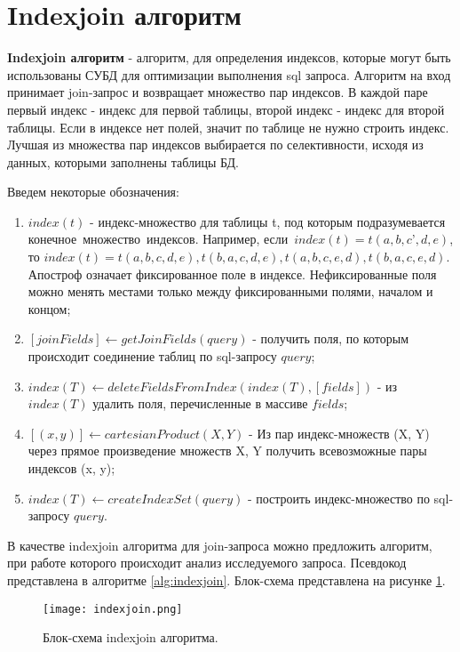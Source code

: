 \section{Indexjoin алгоритм}

\textbf{Indexjoin алгоритм} - алгоритм, для определения индексов, которые могут быть использованы СУБД для оптимизации выполнения sql запроса. Алгоритм на вход принимает join-запрос и возвращает множество пар индексов. В каждой паре первый индекс - индекс для первой таблицы, второй индекс - индекс для второй таблицы. Если в индексе нет полей, значит по таблице не нужно строить индекс. Лучшая из множества пар индексов выбирается по селективности, исходя из данных, которыми заполнены таблицы БД.

Введем некоторые обозначения:
\begin{enumerate}
\item $index(t)$ - индекс-множество для таблицы t, под которым подразумевается конечное множество индексов. Например, если $index(t) = t(a, b, c’, d, e)$, то $index(t) = {t(a, b, c, d, e), t(b, a, c, d, e), t(a, b, c, e, d), t(b, a, c, e, d)}$. Апостроф означает фиксированное поле в индексе. Нефиксированные поля можно менять местами только между фиксированными полями, началом и концом;

\item $[joinFields] \gets getJoinFields(query)$ - получить поля, по которым происходит соединение таблиц по sql-запросу $query$;

\item $index(T) \gets deleteFieldsFromIndex(index(T), [fields])$ - из $index(T)$  удалить поля, перечисленные в массиве $fields$;

\item  $[(x, y)] \gets cartesianProduct(X, Y)$ - Из пар индекс-множеств (X, Y) через прямое произведение множеств X, Y получить всевозможные пары индексов (x, y);

\item $index(T) \gets createIndexSet(query)$ - построить индекс-множество  по sql-запросу $query$.
\end{enumerate}

В качестве indexjoin алгоритма для join-запроса можно предложить алгоритм, при работе которого происходит анализ исследуемого запроса. Псевдокод представлена в алгоритме \ref{alg:indexjoin}. Блок-схема представлена на рисунке \ref{img:indexjoin}.

\begin{figure}[h]
  \centering
  \texttt{[image: indexjoin.png]}
  \caption{Блок-схема indexjoin алгоритма.}
  \label{img:indexjoin}
\end{figure}

